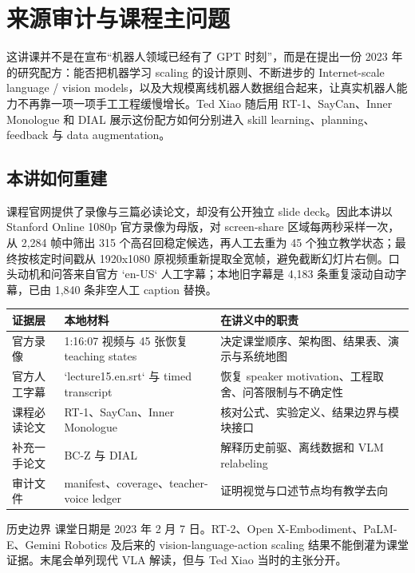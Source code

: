 \section{来源审计与课程主问题}

这讲课并不是在宣布“机器人领域已经有了 GPT 时刻”，而是在提出一份 2023 年的研究配方：能否把机器学习 scaling 的设计原则、不断进步的 Internet-scale language / vision models，以及大规模离线机器人数据组合起来，让真实机器人能力不再靠一项一项手工工程缓慢增长。Ted Xiao 随后用 RT-1、SayCan、Inner Monologue 和 DIAL 展示这份配方如何分别进入 skill learning、planning、feedback 与 data augmentation。

\subsection{本讲如何重建}

课程官网提供了录像与三篇必读论文，却没有公开独立 slide deck。因此本讲以 Stanford Online 1080p 官方录像为母版，对 screen-share 区域每两秒采样一次，从 2,284 帧中筛出 315 个高召回稳定候选，再人工去重为 45 个独立教学状态；最终按核定时间戳从 1920x1080 原视频重新提取全宽帧，避免截断幻灯片右侧。口头动机和问答来自官方 `en-US` 人工字幕；本地旧字幕是 4,183 条重复滚动自动字幕，已由 1,840 条非空人工 caption 替换。

\begin{longtable}{L{0.21\textwidth}L{0.31\textwidth}L{0.38\textwidth}}
\toprule
证据层 & 本地材料 & 在讲义中的职责 \\
\midrule
官方录像 & 1:16:07 视频与 45 张恢复 teaching states & 决定课堂顺序、架构图、结果表、演示与系统地图 \\
官方人工字幕 & `lecture15.en.srt` 与 timed transcript & 恢复 speaker motivation、工程取舍、问答限制与不确定性 \\
课程必读论文 & RT-1、SayCan、Inner Monologue & 核对公式、实验定义、结果边界与模块接口 \\
补充一手论文 & BC-Z 与 DIAL & 解释历史前驱、离线数据和 VLM relabeling \\
审计文件 & manifest、coverage、teacher-voice ledger & 证明视觉与口述节点均有教学去向 \\
\bottomrule
\end{longtable}

\begin{warningbox}{历史边界}
课堂日期是 2023 年 2 月 7 日。RT-2、Open X-Embodiment、PaLM-E、Gemini Robotics 及后来的 vision-language-action scaling 结果不能倒灌为课堂证据。末尾会单列现代 VLA 解读，但与 Ted Xiao 当时的主张分开。
\end{warningbox}


